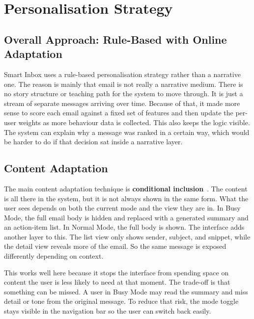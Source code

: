 \section{Personalisation Strategy}

\subsection{Overall Approach: Rule-Based with Online Adaptation}

Smart Inbox uses a rule-based personalisation strategy rather than a
narrative one. The reason is mainly that email is not really a
narrative medium. There is no story structure or teaching path for the
system to move through. It is just a stream of separate messages
arriving over time. Because of that, it made more sense to score each
email against a fixed set of features and then update the per-user
weights as more behaviour data is collected. This also keeps the logic
visible. The system can explain why a message was ranked in a certain
way, which would be harder to do if that decision sat inside a
narrative layer.

\subsection{Content Adaptation}

The main content adaptation technique is
\textbf{conditional inclusion}~\cite{Brusilovsky2007ch18}. The content
is all there in the system, but it is not always shown in the same
form. What the user sees depends on both the current mode and the view
they are in. In Busy Mode, the full email body is hidden and replaced
with a generated summary and an action-item list. In Normal Mode, the
full body is shown. The interface adds another layer to this. The list
view only shows sender, subject, and snippet, while the detail view
reveals more of the email. So the same message is exposed differently
depending on context.

This works well here because it stops the interface from spending
space on content the user is less likely to need at that moment. The
trade-off is that something can be missed. A user in Busy Mode may
read the summary and miss detail or tone from the original message. To
reduce that risk, the mode toggle stays visible in the navigation bar
so the user can switch back easily.

